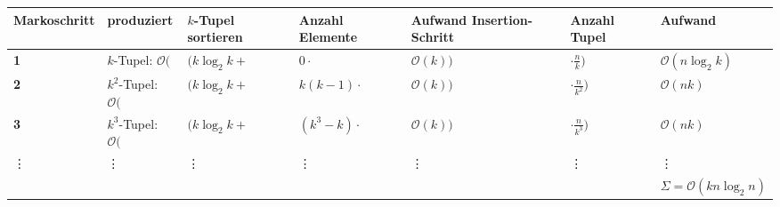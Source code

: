 \begin{tabularx}{\textwidth}{X|p{}p{}p{}p{}p{}|p{}}
	\rowcolor{lightgray} \textbf{Markoschritt} & \textbf{produziert} & \textbf{$k$-Tupel sortieren} & \textbf{Anzahl Elemente} & \textbf{Aufwand Insertion-Schritt} & \textbf{Anzahl Tupel} & \textbf{Aufwand} \\
	\hline
	\textbf{1} & $k$-Tupel: $\mathcal{O}($ & $(k\log_2 k+$ & $0\cdot$ & $\mathcal{O}(k))$ & $\cdot\frac{n}{k})$ & $\mathcal{O}(n\log_2 k)$ \\
	\textbf{2} & $k^2$-Tupel: $\mathcal{O}($ & $(k\log_2 k+$ & $k(k-1)\cdot$ & $\mathcal{O}(k))$ & $\cdot\frac{n}{k^2})$ & $\mathcal{O}(nk)$ \\
	\textbf{3} & $k^3$-Tupel: $\mathcal{O}($ & $(k\log_2 k+$ & $(k^3-k)\cdot$ & $\mathcal{O}(k))$ & $\cdot\frac{n}{k^3})$ & $\mathcal{O}(nk)$ \\
	\vdots & \vdots & \vdots & \vdots & \vdots & \vdots & \vdots \\
	\hline
	&&&&&& $\Sigma = \mathcal{O}(kn\log_2 n)$ \\
\end{tabularx}